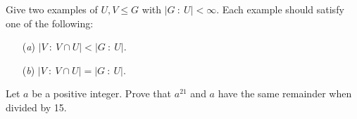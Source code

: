 \documentclass[12pt,letterpaper,boxed]{hmcpset}
\begin{document}
\clearpage


\begin{problem}[5.2.12]
Give two examples of $U,V \leq G$ with $\vert G \ : \ U \vert < \infty$. Each example should satisfy one of the following: 
\begin{itemize}
  \item[(\textit{a})] $\vert V \ : \ V \cap U \vert < \vert G \ : \ U \vert$.
  
  \item[(\textit{b})] $\vert V \ : \ V \cap U \vert = \vert G \ : \ U \vert$.
\end{itemize}
\end{problem}

\begin{solution}
\end{solution}

\clearpage

\begin{problem}[5.3.2]
Let $a$ be a positive integer. Prove that $a^{21}$ and $a$ have the same remainder when divided by 15. 
\end{problem}

\begin{solution}

\end{solution}
\end{document}

